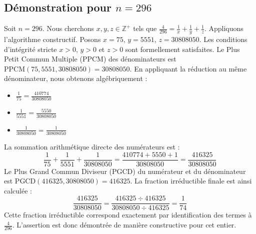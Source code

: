 \documentclass[11pt,a4paper]{article}
\begin{document}
\subsection{Démonstration pour $n = 296$}
Soit $n = 296$. Nous cherchons $x, y, z \in \mathbb{Z}^{+}$ tels que $\frac{4}{296} = \frac{1}{x} + \frac{1}{y} + \frac{1}{z}$.
Appliquons l'algorithme constructif. Posons $x = 75$, $y = 5551$, $z = 30808050$.
Les conditions d'intégrité stricte $x > 0$, $y > 0$ et $z > 0$ sont formellement satisfaites.
Le Plus Petit Commun Multiple (PPCM) des dénominateurs est $\text{PPCM}(75, 5551, 30808050) = 30808050$.
En appliquant la réduction au même dénominateur, nous obtenons algébriquement :
\begin{itemize}
    \item $\frac{1}{75} = \frac{410774}{30808050}$
    \item $\frac{1}{5551} = \frac{5550}{30808050}$
    \item $\frac{1}{30808050} = \frac{1}{30808050}$
\end{itemize}
La sommation arithmétique directe des numérateurs est :
$$ \frac{1}{75} + \frac{1}{5551} + \frac{1}{30808050} = \frac{410774 + 5550 + 1}{30808050} = \frac{416325}{30808050} $$
Le Plus Grand Commun Diviseur (PGCD) du numérateur et du dénominateur est $\text{PGCD}(416325, 30808050) = 416325$.
La fraction irréductible finale est ainsi calculée :
$$ \frac{416325}{30808050} = \frac{416325 \div 416325}{30808050 \div 416325} = \frac{1}{74} $$
Cette fraction irréductible correspond exactement par identification des termes à $\frac{4}{296}$. L'assertion est donc démontrée de manière constructive pour cet entier.
\end{document}
